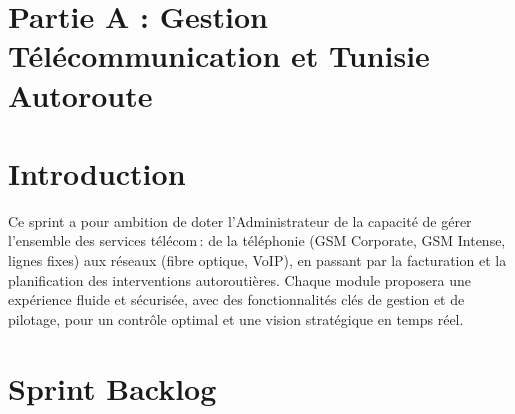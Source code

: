 \documentclass[a4paper,11pt]{report}
\begin{document}
\setcounter{section}{0}


\section*{Partie A : Gestion  Télécommunication et Tunisie Autoroute}


\section{Introduction}

Ce sprint a pour ambition de doter l’Administrateur de la capacité de gérer l’ensemble des services télécom : de la téléphonie (GSM Corporate, GSM Intense, lignes fixes) aux réseaux (fibre optique, VoIP), en passant par la facturation et la planification des interventions autoroutières. Chaque module proposera une expérience fluide et sécurisée, avec des fonctionnalités clés de gestion et de pilotage, pour un contrôle optimal et une vision stratégique en temps réel.

\vspace{1cm}

\section{Sprint Backlog}
\end{document}
